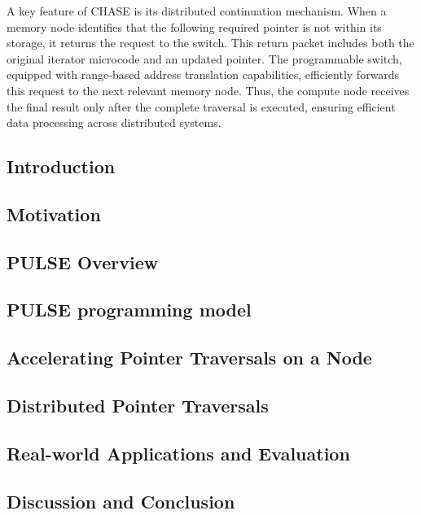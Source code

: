 A key feature of CHASE is its distributed continuation mechanism. When a memory node identifies that the following required pointer is not within its storage, it returns the request to the switch. This return packet includes both the original iterator microcode and an updated pointer. The programmable switch, equipped with range-based address translation capabilities, efficiently forwards this request to the next relevant memory node. Thus, the compute node receives the final result only after the complete traversal is executed, ensuring efficient data processing across distributed systems.

\subsection{Introduction}

\subsection{Motivation}

\subsection{PULSE Overview}
\subsection{PULSE programming model}
\subsection{Accelerating Pointer Traversals on a Node}
\subsection{Distributed Pointer Traversals}
\subsection{Real-world Applications and Evaluation}
\subsection{Discussion and Conclusion}
